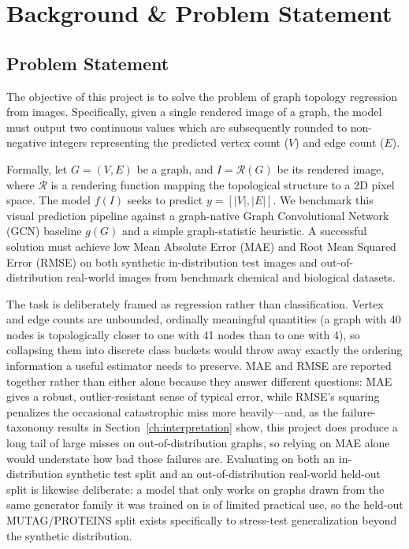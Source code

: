 \documentclass[11pt,letterpaper]{article}
\numberwithin{equation}{section}
\numberwithin{figure}{section}
\numberwithin{table}{section}
\begin{document}
\section{Background \& Problem Statement}
\label{sec:background}

\subsection{Problem Statement}
The objective of this project is to solve the problem of graph topology regression from images. Specifically, given a single rendered image of a graph, the model must output two continuous values which are subsequently rounded to non-negative integers representing the predicted vertex count ($V$) and edge count ($E$).

Formally, let $G = (V, E)$ be a graph, and $I = \mathcal{R}(G)$ be its rendered image, where $\mathcal{R}$ is a rendering function mapping the topological structure to a 2D pixel space. The model $f(I)$ seeks to predict $y = [|V|, |E|]$. We benchmark this visual prediction pipeline against a graph-native Graph Convolutional Network (GCN) baseline $g(G)$ and a simple graph-statistic heuristic. A successful solution must achieve low Mean Absolute Error (MAE) and Root Mean Squared Error (RMSE) on both synthetic in-distribution test images and out-of-distribution real-world images from benchmark chemical and biological datasets.

The task is deliberately framed as regression rather than classification. Vertex and edge counts are unbounded, ordinally meaningful quantities (a graph with 40 nodes is topologically closer to one with 41 nodes than to one with 4), so collapsing them into discrete class buckets would throw away exactly the ordering information a useful estimator needs to preserve. MAE and RMSE are reported together rather than either alone because they answer different questions: MAE gives a robust, outlier-resistant sense of typical error, while RMSE's squaring penalizes the occasional catastrophic miss more heavily---and, as the failure-taxonomy results in Section~\ref{ch:interpretation} show, this project does produce a long tail of large misses on out-of-distribution graphs, so relying on MAE alone would understate how bad those failures are. Evaluating on both an in-distribution synthetic test split and an out-of-distribution real-world held-out split is likewise deliberate: a model that only works on graphs drawn from the same generator family it was trained on is of limited practical use, so the held-out MUTAG/PROTEINS split exists specifically to stress-test generalization beyond the synthetic distribution.
\end{document}
